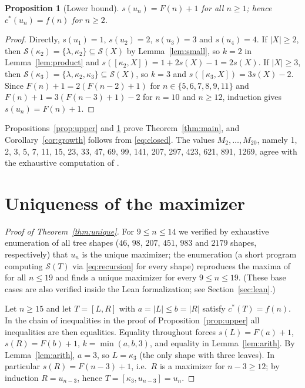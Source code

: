 \documentclass[11pt]{amsart}
\newtheorem{proposition}[theorem]{Proposition}
\theoremstyle{definition}
\theoremstyle{remark}
\newcommand{\lf}{\lambda}
\newcommand{\Sh}{\mathcal{S}}
\newcommand{\cstar}{c^{*}}
\begin{document}
\begin{proposition}[Lower bound]\label{prop:lower}
$s(u_n)=F(n)+1$ for all $n\ge 1$; hence $\cstar(u_n)=f(n)$ for $n\ge 2$.
\end{proposition}

\begin{proof}
Directly, $s(u_1)=1$, $s(u_2)=2$, $s(u_3)=3$ and $s(u_4)=4$.
If $|X|\ge 2$, then $\Sh(\kappa_2)=\{\lf,\kappa_2\}\subseteq\Sh(X)$ by Lemma~\ref{lem:small}, so $k=2$ in Lemma~\ref{lem:product} and $s([\kappa_2,X])=1+2s(X)-1=2s(X)$.
If $|X|\ge 3$, then $\Sh(\kappa_3)=\{\lf,\kappa_2,\kappa_3\}\subseteq\Sh(X)$, so $k=3$ and $s([\kappa_3,X])=3s(X)-2$.
Since $F(n)+1=2(F(n-2)+1)$ for $n\in\{5,6,7,8,9,11\}$ and $F(n)+1=3(F(n-3)+1)-2$ for $n=10$ and $n\ge 12$, induction gives $s(u_n)=F(n)+1$.
\end{proof}

Propositions~\ref{prop:upper} and \ref{prop:lower} prove Theorem~\ref{thm:main}, and Corollary~\ref{cor:growth} follows from \eqref{eq:closed}.
The values $M_2,\dots,M_{20}$, namely 1, 2, 3, 5, 7, 11, 15, 23, 33, 47, 69, 99, 141, 207, 297, 423, 621, 891, 1269, agree with the exhaustive computation of \cite[Fig.~5]{DR2019}.

\section{Uniqueness of the maximizer}\label{sec:unique}

\begin{proof}[Proof of Theorem~\ref{thm:unique}]
For $9\le n\le 14$ we verified by exhaustive enumeration of all tree shapes ($46$, $98$, $207$, $451$, $983$ and $2179$ shapes, respectively) that $u_n$ is the unique maximizer; the enumeration (a short program computing $\Sh(T)$ via \eqref{eq:recursion} for every shape) reproduces the maxima of \cite[Fig.~5]{DR2019} for all $n\le 19$ and finds a unique maximizer for every $9\le n\le 19$.
(These base cases are also verified inside the Lean formalization; see Section~\ref{sec:lean}.)

Let $n\ge 15$ and let $T=[L,R]$ with $a=|L|\le b=|R|$ satisfy $\cstar(T)=f(n)$.
In the chain of inequalities in the proof of Proposition~\ref{prop:upper} all inequalities are then equalities.
Equality throughout forces $s(L)=F(a)+1$, $s(R)=F(b)+1$, $k=\min(a,b,3)$, and equality in Lemma~\ref{lem:arith}.
By Lemma~\ref{lem:arith}, $a=3$, so $L=\kappa_3$ (the only shape with three leaves).
In particular $s(R)=F(n-3)+1$, i.e.\ $R$ is a maximizer for $n-3\ge 12$; by induction $R=u_{n-3}$, hence $T=[\kappa_3,u_{n-3}]=u_n$.
\end{proof}
\end{document}
